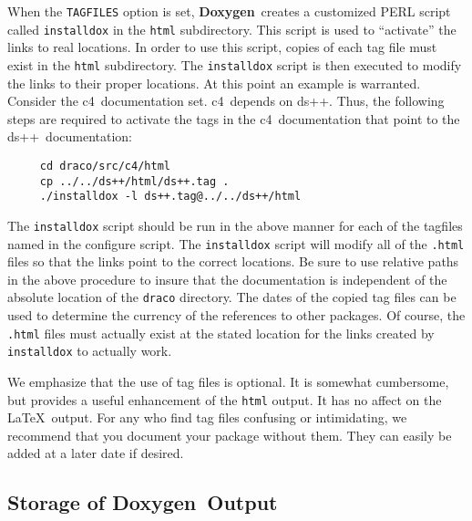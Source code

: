 \documentclass[11pt]{nmemo}
\newcommand{\doxy}{{\normalfont\bfseries Doxygen}}
\newcommand{\dsxx}{{\normalfont\sffamily ds++}}
\newcommand{\cfour}{{\normalfont\sffamily c4}}
\begin{document}
When the \texttt{TAGFILES} option is set, \doxy\ creates a customized
PERL script called \texttt{installdox} in the \texttt{html}
subdirectory.  This script is used to ``activate'' the links to real
locations.  In order to use this script, copies of each tag file must
exist in the \texttt{html} subdirectory.  The \texttt{installdox}
script is then executed to modify the links to their proper locations.
At this point an example is warranted.  Consider the \cfour\ 
documentation set.  \cfour\ depends on \dsxx.  Thus, the following
steps are required to activate the tags in the \cfour\ documentation
that point to the \dsxx\ documentation:
\begin{verbatim}
     cd draco/src/c4/html
     cp ../../ds++/html/ds++.tag .
     ./installdox -l ds++.tag@../../ds++/html
\end{verbatim}
 The \texttt{installdox} script should be run in the above manner for each
of the tagfiles named in the configure script.
The \texttt{installdox} script will modify all of the \texttt{.html}
files so that the links point to the correct locations.  Be sure to 
use relative paths in the above procedure to insure that the 
documentation is independent of the
absolute location of the \texttt{draco} directory.  The dates of the
copied tag files
can be used to determine the currency of the references to other packages.
Of course, the \texttt{.html} files must actually exist at the stated location
for the links created by \texttt{installdox} to actually work.

We emphasize that the use of tag files is optional. It is somewhat cumbersome,
but provides a useful enhancement of the \texttt{html} output. It has no
affect on the \LaTeX\ output. For any who find tag files confusing or
intimidating, we recommend that you document your package without them. They
can easily be added at a later date if desired.

\subsection{Storage of \doxy\ Output}
\end{document}

